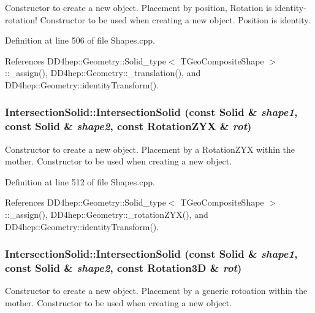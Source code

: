 Constructor to create a new object. Placement by position, Rotation is identity-\/rotation! Constructor to be used when creating a new object. Position is identity. 

Definition at line 506 of file Shapes.cpp.

References DD4hep::Geometry::Solid\_\-type$<$ TGeoCompositeShape $>$::\_\-assign(), DD4hep::Geometry::\_\-translation(), and DD4hep::Geometry::identityTransform().\hypertarget{class_d_d4hep_1_1_geometry_1_1_intersection_solid_a350b9cf8a8d458930e25341c1be6f6af}{
\subsubsection[{IntersectionSolid}]{\setlength{\rightskip}{0pt plus 5cm}IntersectionSolid::IntersectionSolid (const {\bf Solid} \& {\em shape1}, \/  const {\bf Solid} \& {\em shape2}, \/  const {\bf RotationZYX} \& {\em rot})}}
\label{class_d_d4hep_1_1_geometry_1_1_intersection_solid_a350b9cf8a8d458930e25341c1be6f6af}


Constructor to create a new object. Placement by a RotationZYX within the mother. Constructor to be used when creating a new object. 

Definition at line 512 of file Shapes.cpp.

References DD4hep::Geometry::Solid\_\-type$<$ TGeoCompositeShape $>$::\_\-assign(), DD4hep::Geometry::\_\-rotationZYX(), and DD4hep::Geometry::identityTransform().\hypertarget{class_d_d4hep_1_1_geometry_1_1_intersection_solid_ae8220a5808a24ab8bacec490276ace38}{
\subsubsection[{IntersectionSolid}]{\setlength{\rightskip}{0pt plus 5cm}IntersectionSolid::IntersectionSolid (const {\bf Solid} \& {\em shape1}, \/  const {\bf Solid} \& {\em shape2}, \/  const {\bf Rotation3D} \& {\em rot})}}
\label{class_d_d4hep_1_1_geometry_1_1_intersection_solid_ae8220a5808a24ab8bacec490276ace38}


Constructor to create a new object. Placement by a generic rotoation within the mother. Constructor to be used when creating a new object. 

